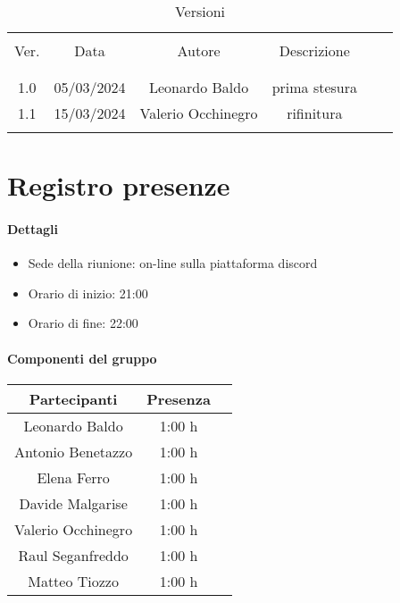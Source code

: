 \documentclass[italian,12pt]{article} %
\begin{document}


\newpage





\begin{table}[!h]
	\caption{Versioni}
	\begin{center}
		\begin{tabular}{ c c c c c c }
			\hline \\[-2ex]
			Ver. & Data & Autore & Descrizione \\
			\\[-2ex] \hline \\[-1.5ex]
			1.0 & 05/03/2024 & Leonardo Baldo& prima stesura \\
			1.1 & 15/03/2024 & Valerio Occhinegro& rifinitura  \\
			\\[-1.5ex] \hline
		\end{tabular}
	\end{center}
\end{table}
\newpage

\tableofcontents

\newpage

\section{Registro presenze}

\paragraph{Dettagli}

\begin{itemize}
	\item Sede della riunione: on-line sulla piattaforma discord
	\item Orario di inizio: 21:00
	\item Orario di fine: 22:00
\end{itemize}

\paragraph{Componenti del gruppo}

\begin{flushleft}
\begin{table}[!h]
\begin{tabular}{ |c|c|c| } 
	\hline
	Partecipanti & Presenza \\
	\hline 
	Leonardo Baldo 		 & 1:00 h \\ 
	Antonio Benetazzo 	 & 1:00 h \\
	Elena Ferro 		 & 1:00 h \\
	Davide Malgarise 	 & 1:00 h \\
	Valerio Occhinegro 	 & 1:00 h \\
	Raul Seganfreddo 	 & 1:00 h \\
	Matteo Tiozzo 		 & 1:00 h \\ 
	\hline
\end{tabular}
\end{table}
\end{flushleft}
\end{document}
